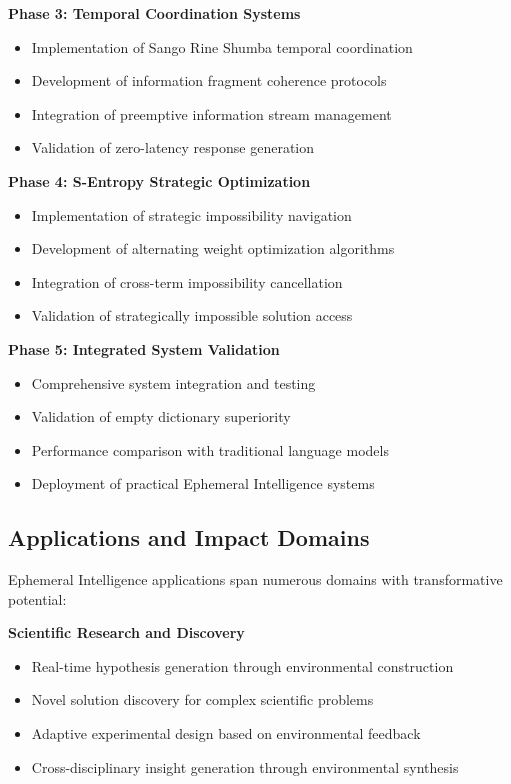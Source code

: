 \documentclass[12pt,a4paper]{article}
\begin{document}
\textbf{Phase 3: Temporal Coordination Systems}
\begin{itemize}
\item Implementation of Sango Rine Shumba temporal coordination
\item Development of information fragment coherence protocols
\item Integration of preemptive information stream management
\item Validation of zero-latency response generation
\end{itemize}

\textbf{Phase 4: S-Entropy Strategic Optimization}
\begin{itemize}
\item Implementation of strategic impossibility navigation
\item Development of alternating weight optimization algorithms
\item Integration of cross-term impossibility cancellation
\item Validation of strategically impossible solution access
\end{itemize}

\textbf{Phase 5: Integrated System Validation}
\begin{itemize}
\item Comprehensive system integration and testing
\item Validation of empty dictionary superiority
\item Performance comparison with traditional language models
\item Deployment of practical Ephemeral Intelligence systems
\end{itemize}

\subsection{Applications and Impact Domains}

Ephemeral Intelligence applications span numerous domains with transformative potential:

\textbf{Scientific Research and Discovery}
\begin{itemize}
\item Real-time hypothesis generation through environmental construction
\item Novel solution discovery for complex scientific problems
\item Adaptive experimental design based on environmental feedback
\item Cross-disciplinary insight generation through environmental synthesis
\end{itemize}
\end{document}
